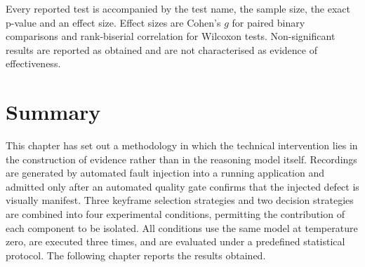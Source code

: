 Every reported test is accompanied by the test name, the sample size, the
exact p-value and an effect size. Effect sizes are Cohen's $g$ for paired
binary comparisons and rank-biserial correlation for Wilcoxon tests.
Non-significant results are reported as obtained and are not characterised
as evidence of effectiveness.


\section{Summary}
\label{sec:m-summary}

This chapter has set out a methodology in which the technical intervention
lies in the construction of evidence rather than in the reasoning model
itself. Recordings are generated by automated fault injection into a
running application and admitted only after an automated quality gate
confirms that the injected defect is visually manifest. Three keyframe
selection strategies and two decision strategies are combined into four
experimental conditions, permitting the contribution of each component to
be isolated. All conditions use the same model at temperature zero, are
executed three times, and are evaluated under a predefined statistical
protocol. The following chapter reports the results obtained.